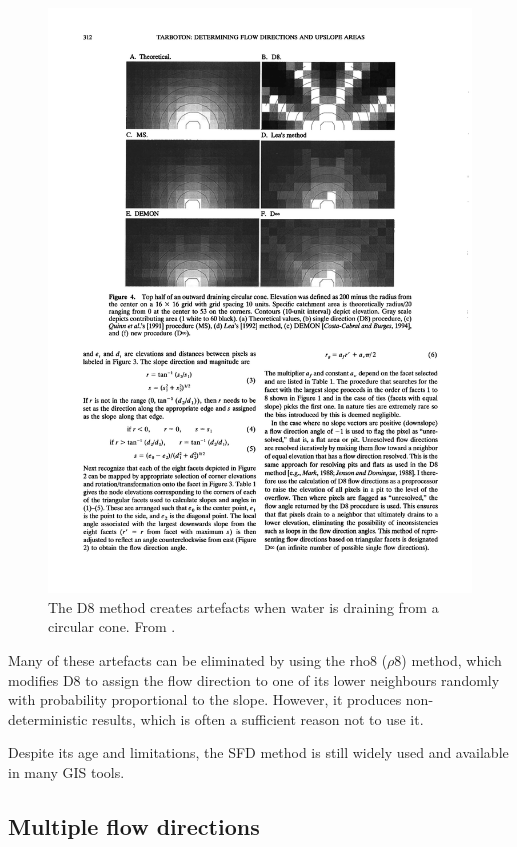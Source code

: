 \begin{figure}[htbp]
\centering
\includegraphics[width=0.95\linewidth]{figs/d8.pdf}
\caption{The D8 method creates artefacts when water is draining from a circular cone. From \citet{Tarborton97}.}%
\label{fig:d8}
\end{figure}

Many of these artefacts can be eliminated by using the rho8 (\(\rho8\)) method, which modifies D8 to assign the flow direction to one of its lower neighbours randomly with probability proportional to the slope.
However, it produces non-deterministic results, which is often a sufficient reason not to use it.

Despite its age and limitations, the SFD method is still widely used and available in many GIS tools\@.

\subsection{Multiple flow directions}

